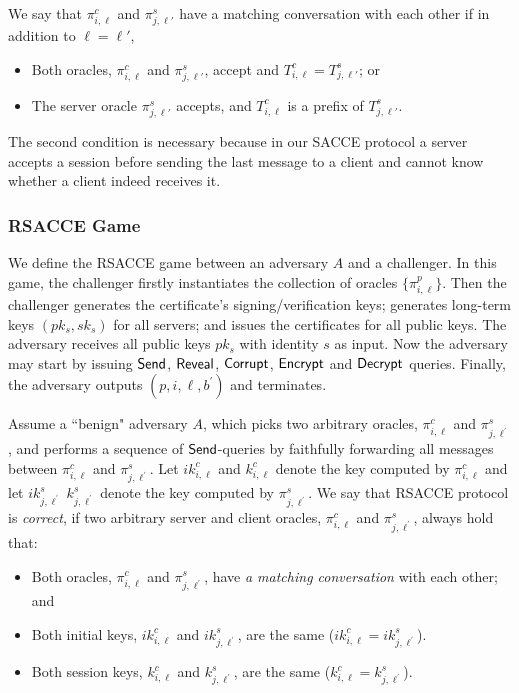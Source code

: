 \begin{definition}
 We say that $\pi^c_{i,\ell}$ and $\pi^s_{j,\ell'}$ have a matching conversation with each other if  in addition to $\ell=\ell'$,
 \begin{itemize}
  \item{Both oracles, $\pi^c_{i, \ell}$ and $\pi^s_{j,\ell'}$, accept and
  $T^c_{i,\ell} = T^s_{j,\ell'}$; or }
  \item{The server oracle $\pi^s_{j, \ell'}$ accepts,
  and $T^c_{i,\ell}$ is a prefix of $T^s_{j,\ell'}$.}
 \end{itemize}
\end{definition}
\begin{remark}
 The second condition is necessary because in our SACCE protocol
 a server accepts a session before sending the last message to a client
 and cannot know whether a client indeed receives it.
\end{remark}

\subsubsection{RSACCE Game}
We define the RSACCE game between an adversary $A$ and a challenger.
In this game, the challenger firstly instantiates the collection of oracles
$\{\pi^p_{i,\ell}\}$.
Then the challenger generates the certificate's signing/verification keys;
generates long-term keys $(pk_s, sk_s)$ for all servers;
and issues the certificates for all public keys.
The adversary receives all public keys $pk_s$ with identity $s$ as input.
Now the adversary may start by issuing $\mathsf{Send}$, $\mathsf{Reveal}$, $\mathsf{Corrupt}$, $\mathsf{Encrypt}$ and $\mathsf{Decrypt}$ queries.
Finally, the adversary outputs $(p, i, \ell, b^{\prime})$ and terminates.

\begin{definition}[Correctness]
 Assume a ``benign" adversary $A$, which picks two arbitrary oracles, $\pi^c_{i, \ell}$ and $\pi^s_{j, \ell^{\prime}}$,
 and performs a sequence of $\mathsf{Send}$-queries by faithfully forwarding all messages
 between $\pi^c_{i, \ell}$ and $\pi^s_{j, \ell^{\prime}}$.
 Let $ik^c_{i, \ell}$ and $k^c_{i, \ell}$ denote the key computed by $\pi^c_{i, \ell}$
 and let $ik^s_{j, \ell^{\prime}}$ $k^s_{j, \ell^{\prime}}$ denote the key computed by $\pi^s_{j, \ell^{\prime}}$.
 We say that RSACCE protocol is \textit{correct}, if two arbitrary server and client oracles, $\pi^c_{i, \ell}$ and $\pi^s_{j, \ell^{\prime}}$, always hold that:
 \begin{itemize}
  \item{Both oracles, $\pi^c_{i, \ell}$ and $\pi^s_{j, \ell^{\prime}}$, have \textit{a matching conversation} with each other; and}
  \item{Both initial keys, $ik^c_{i, \ell}$ and $ik^s_{j, \ell^{\prime}}$, are the same ($ik^c_{i, \ell} = ik^s_{j, \ell^{\prime}}$).}
  \item{Both session keys, $k^c_{i, \ell}$ and $k^s_{j, \ell^{\prime}}$, are the same ($k^c_{i, \ell} = k^s_{j, \ell^{\prime}}$).}
 \end{itemize}
\end{definition}

